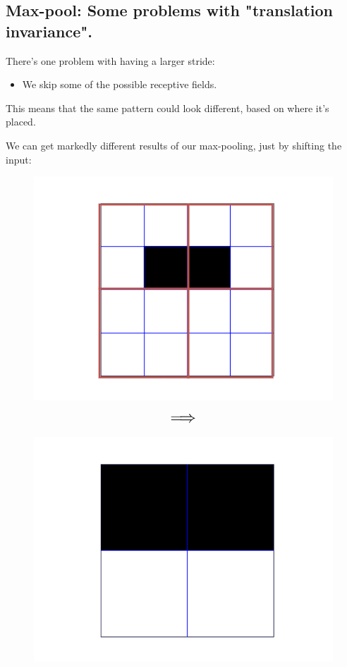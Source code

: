     \subsection{Max-pool: Some problems with "translation invariance".}

        There's one problem with having a larger stride:

        \begin{itemize}
            \item We skip some of the possible receptive fields.
        \end{itemize}

        This means that the same pattern could look different, based on where it's placed.

        \miniex We can get markedly different results of our max-pooling, just by shifting the input:

        \begin{figure}[ht]
            \begin{minipage}{.35\textwidth}
              \centering
              \includegraphics[width=.6\linewidth]{images/convolutional_neural_networks_images/maxpool_center.png}
            \end{minipage}
            \begin{minipage}{.1\textwidth}
                \centering
                $$\mathlarger{\mathlarger{\mathlarger{\implies}}}$$
            \end{minipage}
            \begin{minipage}{.35\textwidth}
              \centering
              \includegraphics[width=.6\linewidth]{images/convolutional_neural_networks_images/center_maxpooled.png}
            \end{minipage}
        \end{figure}

